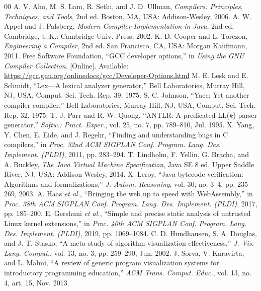 \documentclass[conference]{IEEEtran}
\begin{document}
\begin{thebibliography}{00}
 A. V. Aho, M. S. Lam, R. Sethi, and J. D. Ullman, \emph{Compilers: Principles, Techniques, and Tools}, 2nd ed. Boston, MA, USA: Addison-Wesley, 2006.
 A. W. Appel and J. Palsberg, \emph{Modern Compiler Implementation in Java}, 2nd ed. Cambridge, U.K.: Cambridge Univ. Press, 2002.
 K. D. Cooper and L. Torczon, \emph{Engineering a Compiler}, 2nd ed. San Francisco, CA, USA: Morgan Kaufmann, 2011.
 Free Software Foundation, ``GCC developer options,'' in \emph{Using the GNU Compiler Collection}. [Online]. Available: \url{https://gcc.gnu.org/onlinedocs/gcc/Developer-Options.html}
 M. E. Lesk and E. Schmidt, ``Lex---A lexical analyzer generator,'' Bell Laboratories, Murray Hill, NJ, USA, Comput. Sci. Tech. Rep. 39, 1975.
 S. C. Johnson, ``Yacc: Yet another compiler-compiler,'' Bell Laboratories, Murray Hill, NJ, USA, Comput. Sci. Tech. Rep. 32, 1975.
 T. J. Parr and R. W. Quong, ``ANTLR: A predicated-LL($k$) parser generator,'' \emph{Softw.: Pract. Exper.}, vol. 25, no. 7, pp. 789--810, Jul. 1995.
 X. Yang, Y. Chen, E. Eide, and J. Regehr, ``Finding and understanding bugs in C compilers,'' in \emph{Proc. 32nd ACM SIGPLAN Conf. Program. Lang. Des. Implement. (PLDI)}, 2011, pp. 283--294.
 T. Lindholm, F. Yellin, G. Bracha, and A. Buckley, \emph{The Java Virtual Machine Specification}, Java SE 8 ed. Upper Saddle River, NJ, USA: Addison-Wesley, 2014.
 X. Leroy, ``Java bytecode verification: Algorithms and formalizations,'' \emph{J. Autom. Reasoning}, vol. 30, no. 3--4, pp. 235--269, 2003.
 A. Haas \emph{et al.}, ``Bringing the web up to speed with WebAssembly,'' in \emph{Proc. 38th ACM SIGPLAN Conf. Program. Lang. Des. Implement. (PLDI)}, 2017, pp. 185--200.
 E. Gershuni \emph{et al.}, ``Simple and precise static analysis of untrusted Linux kernel extensions,'' in \emph{Proc. 40th ACM SIGPLAN Conf. Program. Lang. Des. Implement. (PLDI)}, 2019, pp. 1069--1084.
 C. D. Hundhausen, S. A. Douglas, and J. T. Stasko, ``A meta-study of algorithm visualization effectiveness,'' \emph{J. Vis. Lang. Comput.}, vol. 13, no. 3, pp. 259--290, Jun. 2002.
 J. Sorva, V. Karavirta, and L. Malmi, ``A review of generic program visualization systems for introductory programming education,'' \emph{ACM Trans. Comput. Educ.}, vol. 13, no. 4, art. 15, Nov. 2013.

\end{thebibliography}
\end{document}
